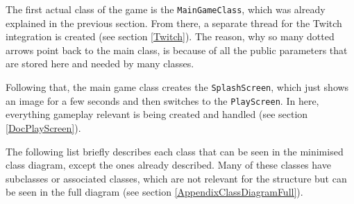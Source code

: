 \documentclass[12p]{article}
\begin{document}
The first actual class of the game is the \texttt{MainGameClass}, which was already explained in the previous section. From there, a separate thread for the Twitch integration is created (see section \ref{Twitch}). The reason, why so many dotted arrows point back to the main class, is because of all the public parameters that are stored here and needed by many classes.

Following that, the main game class creates the \texttt{SplashScreen}, which just shows an image for a few seconds and then switches to the \texttt{PlayScreen}. In here, everything gameplay relevant is being created and handled (see section \ref{DocPlayScreen}). 

The following list briefly describes each class that can be seen in the minimised class diagram, except the ones already described. Many of these classes have subclasses or associated classes, which are not relevant for the structure but can be seen in the full diagram (see section \ref{AppendixClassDiagramFull}).
\end{document}
